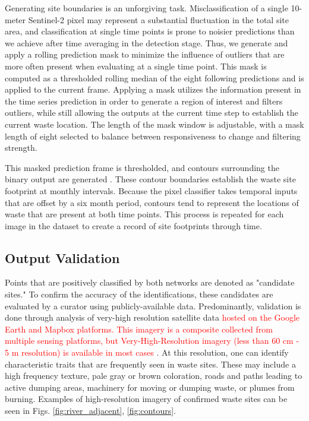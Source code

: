 \documentclass[10pt,letterpaper]{article}
\begin{document}
Generating site boundaries is an unforgiving task. Misclassification of a single 10-meter Sentinel-2 pixel may represent a substantial fluctuation in the total site area, and classification at single time points is prone to noisier predictions than we achieve after time averaging in the detection stage. Thus, we generate and apply a rolling prediction mask to minimize the influence of outliers that are more often present when evaluating at a single time point. This mask is computed as a thresholded rolling median of the eight following predictions and is applied to the current frame. Applying a mask utilizes the information present in the time series prediction in order to generate a region of interest and filters outliers, while still allowing the outputs at the current time step to establish the current waste location. The length of the mask window is adjustable, with a mask length of eight selected to balance between responsiveness to change and filtering strength.

This masked prediction frame is thresholded, and contours surrounding the binary output are generated \cite{suzuki1985topological}. These contour boundaries establish the waste site footprint at monthly intervals. Because the pixel classifier takes temporal inputs that are offset by a six month period, contours tend to represent the locations of waste that are present at both time points. This process is repeated for each image in the dataset to create a record of site footprints through time.

\subsection*{Output Validation} 
\label{sec:validation}
Points that are positively classified by both networks are denoted as "candidate sites." To confirm the accuracy of the identifications, these candidates are evaluated by a curator using publicly-available data. Predominantly, validation is done through analysis of very-high resolution satellite data \textcolor{red}{hosted on the Google Earth and Mapbox platforms. This imagery is a composite collected from multiple sensing platforms, but Very-High-Resolution imagery (less than 60 cm - 5 m resolution) is available in most cases \cite{lesiv2018characterizing}}. At this resolution, one can identify characteristic traits that are frequently seen in waste sites. These may include a high frequency texture, pale gray or brown coloration, roads and paths leading to active dumping areas, machinery for moving or dumping waste, or plumes from burning. Examples of high-resolution imagery of confirmed waste sites can be seen in Figs. \ref{fig:river_adjacent}, \ref{fig:contours}.
\end{document}
